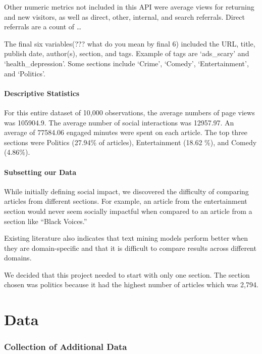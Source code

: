 \documentclass[10pt,letterpaper]{article}
\begin{document}
Other numeric metrics not included in this API were average views for
returning and new visitors, as well as direct, other, internal, and
search referrals. Direct referrals are a count of \ldots{}

The final six variables(??? what do you mean by final 6) included the
URL, title, publish date, author(s), section, and tags. Example of tags
are `ads\_scary' and `health\_depression'. Some sections include
`Crime', `Comedy', `Entertainment', and `Politics'.

\hypertarget{descriptive-statistics}{%
\paragraph{Descriptive Statistics}\label{descriptive-statistics}}

For this entire dataset of 10,000 observations, the average numbers of
page views was 105904.9. The average number of social interactions was
12957.97. An average of 77584.06 engaged minutes were spent on each
article. The top three sections were Politics (27.94\% of articles),
Entertainment (18.62 \%), and Comedy (4.86\%).

\hypertarget{subsetting-our-data}{%
\paragraph{Subsetting our Data}\label{subsetting-our-data}}

While initially defining social impact, we discovered the difficulty of
comparing articles from different sections. For example, an article from
the entertainment section would never seem socially impactful when
compared to an article from a section like ``Black Voices.''

Existing literature also indicates that text mining models perform
better when they are domain-specific and that it is difficult to compare
results across different domains.

We decided that this project needed to start with only one section. The
section chosen was politics because it had the highest number of
articles which was 2,794.

\hypertarget{data}{%
\section{Data}\label{data}}

\hypertarget{collection-of-additional-data}{%
\subsubsection{Collection of Additional
Data}\label{collection-of-additional-data}}
\end{document}

